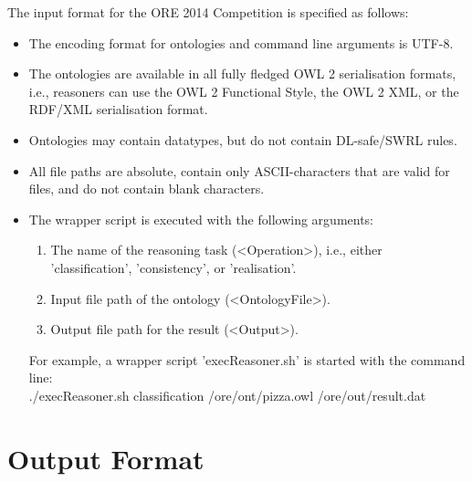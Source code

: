 \documentclass{article}
\begin{document}
The input format for the ORE 2014 Competition is specified as follows:
\begin{itemize}
\item The encoding format for ontologies and command line arguments is \mbox{UTF-8}.
\item The ontologies are available in all fully fledged OWL 2 serialisation formats, i.e., reasoners can use the OWL 2 Functional Style, the OWL 2 XML, or the RDF/XML serialisation format.
\item Ontologies may contain datatypes, but do not contain DL-safe/SWRL rules.
\item All file paths are absolute, contain only ASCII-characters that are valid for files, and do not contain blank characters.
\item The wrapper script is executed with the following arguments:
\begin{enumerate}
\item The name of the reasoning task (\textless Operation\textgreater), i.e., either 'classification', 'consistency', or 'realisation'.
\item Input file path of the ontology (\textless OntologyFile\textgreater).
\item Output file path for the result (\textless Output\textgreater).
\end{enumerate}
For example, a wrapper script 'execReasoner.sh' is started with the command line: \\
./execReasoner.sh classification /ore/ont/pizza.owl /ore/out/result.dat
\end{itemize}




\section{Output Format}
\end{document}
